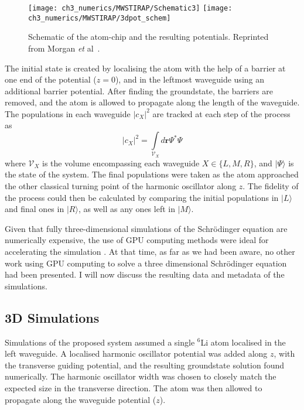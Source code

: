 \begin{figure}[tb]
    \centering
  \texttt{[image: ch3\_numerics/MWSTIRAP/Schematic3]}
  \texttt{[image: ch3\_numerics/MWSTIRAP/3dpot\_schem]}
  \caption{Schematic of the atom-chip and the resulting potentials. Reprinted from Morgan {\textit{et } al}~\cite{AO:Morgan_pra_2013}.}
  \label{fig:schematic_atom-chip}
\end{figure}

The initial state is created by localising the atom with the help of a barrier at one end of the potential ($z=0$), and in the leftmost waveguide using an additional barrier potential. After finding the groundstate, the barriers are removed, and the atom is allowed to propagate along the length of the waveguide. The populations in each waveguide $|c_{X}|^2$ are tracked at each step of the process as
\begin{equation}
    |c_X|^2 = \int\limits_{\mathcal{V}_X} d\mathbf{r}  \Psi^{*} \Psi
\end{equation}
where $\mathcal{V}_X$ is the volume encompassing each waveguide $X \in \{L,M,R\}$, and $| \Psi \rangle$ is the state of the system.
The final populations were taken as the atom approached the other classical turning point of the harmonic oscillator along $z$. The fidelity of the process could then be calculated by comparing the initial populations in $| L \rangle$ and final ones in $|R \rangle$, as well as any ones left in $| M \rangle$.

Given that fully three-dimensional simulations of the Schr\"odinger equation are numerically expensive, the use of GPU computing methods were ideal for accelerating the simulation \cite{Num:Bauke_cpc_2011}. At that time, as far as we had been aware, no other work using GPU computing to solve a three dimensional Schr\"odinger equation had been presented. I will now discuss the resulting data and metadata of the simulations.

\subsection{3D Simulations}
\label{sec:Results}

Simulations of the proposed system assumed a single $^{6}$Li atom localised in the left waveguide. A localised harmonic oscillator potential was added along $z$, with the transverse guiding potential, and the resulting groundstate solution found numerically. The harmonic oscillator width was chosen to closely match the expected size in the transverse direction. The atom was then allowed to propagate along the waveguide potential ($z$).

